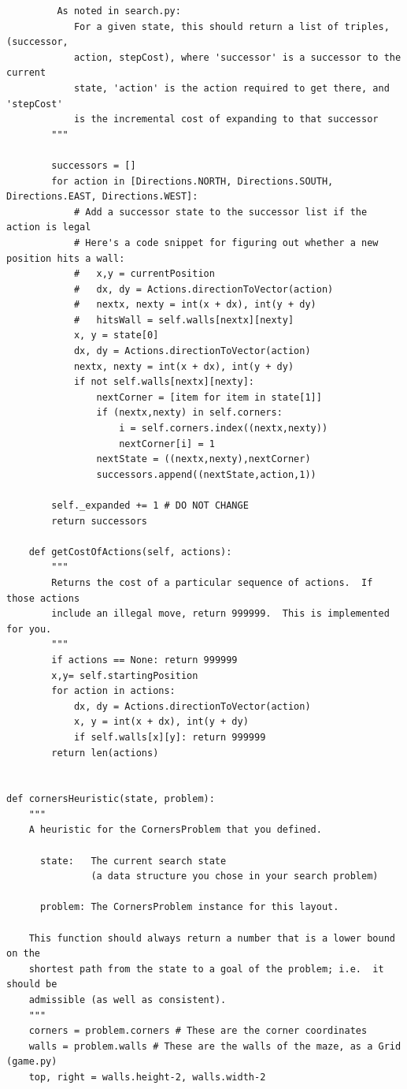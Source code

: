 \documentclass[a4paper, 11pt]{article}
\begin{document}
\begin{lstlisting}
         As noted in search.py:
            For a given state, this should return a list of triples, (successor,
            action, stepCost), where 'successor' is a successor to the current
            state, 'action' is the action required to get there, and 'stepCost'
            is the incremental cost of expanding to that successor
        """

        successors = []
        for action in [Directions.NORTH, Directions.SOUTH, Directions.EAST, Directions.WEST]:
            # Add a successor state to the successor list if the action is legal
            # Here's a code snippet for figuring out whether a new position hits a wall:
            #   x,y = currentPosition
            #   dx, dy = Actions.directionToVector(action)
            #   nextx, nexty = int(x + dx), int(y + dy)
            #   hitsWall = self.walls[nextx][nexty]
            x, y = state[0]
            dx, dy = Actions.directionToVector(action)
            nextx, nexty = int(x + dx), int(y + dy)
            if not self.walls[nextx][nexty]:
                nextCorner = [item for item in state[1]]
                if (nextx,nexty) in self.corners:
                    i = self.corners.index((nextx,nexty))
                    nextCorner[i] = 1
                nextState = ((nextx,nexty),nextCorner)
                successors.append((nextState,action,1))

        self._expanded += 1 # DO NOT CHANGE
        return successors

    def getCostOfActions(self, actions):
        """
        Returns the cost of a particular sequence of actions.  If those actions
        include an illegal move, return 999999.  This is implemented for you.
        """
        if actions == None: return 999999
        x,y= self.startingPosition
        for action in actions:
            dx, dy = Actions.directionToVector(action)
            x, y = int(x + dx), int(y + dy)
            if self.walls[x][y]: return 999999
        return len(actions)


def cornersHeuristic(state, problem):
    """
    A heuristic for the CornersProblem that you defined.

      state:   The current search state
               (a data structure you chose in your search problem)

      problem: The CornersProblem instance for this layout.

    This function should always return a number that is a lower bound on the
    shortest path from the state to a goal of the problem; i.e.  it should be
    admissible (as well as consistent).
    """
    corners = problem.corners # These are the corner coordinates
    walls = problem.walls # These are the walls of the maze, as a Grid (game.py)
    top, right = walls.height-2, walls.width-2


\end{lstlisting}
\end{document}
